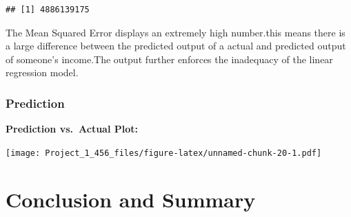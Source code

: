 \documentclass[
]{article}
\newenvironment{Shaded}{\begin{snugshade}}{\end{snugshade}}
\newcommand{\AttributeTok}[1]{\textcolor[rgb]{0.13,0.29,0.53}{#1}}
\newcommand{\CommentTok}[1]{\textcolor[rgb]{0.56,0.35,0.01}{\textit{#1}}}
\newcommand{\DecValTok}[1]{\textcolor[rgb]{0.00,0.00,0.81}{#1}}
\newcommand{\FunctionTok}[1]{\textcolor[rgb]{0.13,0.29,0.53}{\textbf{#1}}}
\newcommand{\NormalTok}[1]{#1}
\newcommand{\OtherTok}[1]{\textcolor[rgb]{0.56,0.35,0.01}{#1}}
\newcommand{\SpecialCharTok}[1]{\textcolor[rgb]{0.81,0.36,0.00}{\textbf{#1}}}
\newcommand{\StringTok}[1]{\textcolor[rgb]{0.31,0.60,0.02}{#1}}
\begin{document}
\begin{verbatim}
## [1] 4886139175
\end{verbatim}

The Mean Squared Error displays an extremely high number.this means
there is a large difference between the predicted output of a actual and
predicted output of someone's income.The output further enforces the
inadequacy of the linear regression model.

\subsubsection{Prediction}\label{prediction}

\textbf{Prediction vs.~Actual Plot:}

\begin{Shaded}
\end{Shaded}

\texttt{[image: Project\_1\_456\_files/figure-latex/unnamed-chunk-20-1.pdf]}

\section{Conclusion and Summary}\label{conclusion-and-summary}
\end{document}
